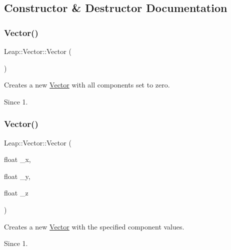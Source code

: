 \subsection{Constructor \& Destructor Documentation}
\mbox{\label{struct_leap_1_1_vector_a0d7a6417136be2cde1ddd56c39244929}} 
\subsubsection{\texorpdfstring{Vector()}{Vector()}\hspace{0.1cm}{\footnotesize\ttfamily [1/3]}}
{\footnotesize\ttfamily Leap\+::\+Vector\+::\+Vector (\begin{DoxyParamCaption}{ }\end{DoxyParamCaption})\hspace{0.3cm}{\ttfamily [inline]}}

Creates a new \hyperlink{struct_leap_1_1_vector}{Vector} with all components set to zero. \begin{DoxySince}{Since}
1. 
\end{DoxySince}
\mbox{\label{struct_leap_1_1_vector_a58bde18133811a15d122a785f0b36b80}} 
\subsubsection{\texorpdfstring{Vector()}{Vector()}\hspace{0.1cm}{\footnotesize\ttfamily [2/3]}}
{\footnotesize\ttfamily Leap\+::\+Vector\+::\+Vector (\begin{DoxyParamCaption}\item[{float}]{\+\_\+x,  }\item[{float}]{\+\_\+y,  }\item[{float}]{\+\_\+z }\end{DoxyParamCaption})\hspace{0.3cm}{\ttfamily [inline]}}

Creates a new \hyperlink{struct_leap_1_1_vector}{Vector} with the specified component values.


\begin{DoxyCodeInclude}
\end{DoxyCodeInclude}
 \begin{DoxySince}{Since}
1. 
\end{DoxySince}
\mbox{\label{struct_leap_1_1_vector_a2b271c5d88e466f17771e62bd8faea94}} 
